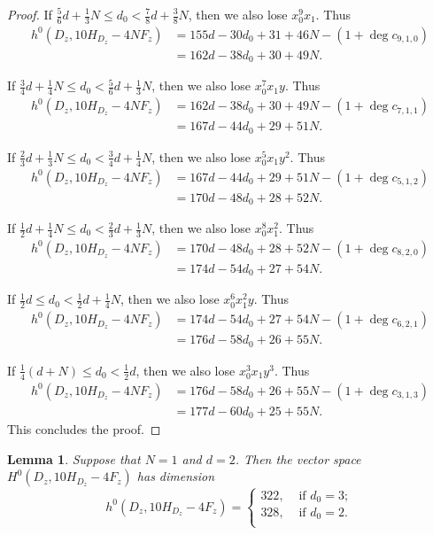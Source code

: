 \documentclass[a4paper,11pt]{amsart}
\newtheorem{lem}[thm]{Lemma}
\theoremstyle{definition}
\theoremstyle{remark}
\numberwithin{equation}{section}
\begin{document}
\begin{proof}
	If $\frac56d + \frac13 N \le d_0 < \frac78d + \frac38 N$, then we also lose $x_0^9x_1$. Thus
	\begin{align*}
		h^0(D_z, 10H_{D_z} - 4NF_z) & = 155d - 30d_0 + 31 + 46N - (1 + \deg c_{9, 1, 0}) \\
		& = 162d - 38d_0 + 30 + 49N.
	\end{align*}
	
	If $\frac34d + \frac14 N \le d_0 < \frac56d + \frac13 N$, then we also lose $x_0^7x_1y$. Thus
	\begin{align*}
		h^0(D_z, 10H_{D_z} - 4NF_z) & = 162d - 38d_0 + 30 + 49N - (1 + \deg c_{7, 1, 1}) \\
		& = 167d - 44d_0 + 29 + 51N.
	\end{align*}
	
	If $\frac23d + \frac13 N \le d_0 < \frac34d + \frac14 N$, then we also lose $x_0^5x_1y^2$. Thus
	\begin{align*}
		h^0(D_z, 10H_{D_z} - 4NF_z) & = 167d - 44d_0 + 29 + 51N - (1 + \deg c_{5, 1, 2}) \\
		& = 170d - 48d_0 + 28 + 52N.
	\end{align*}
	
	If $\frac12d + \frac14 N \le d_0 < \frac23d + \frac13 N$, then we also lose $x_0^8x_1^2$. Thus
	\begin{align*}
		h^0(D_z, 10H_{D_z} - 4NF_z) & = 170d - 48d_0 + 28 + 52N - (1 + \deg c_{8, 2, 0}) \\
		& = 174d - 54d_0 + 27 + 54N.
	\end{align*}
	
	If $\frac12d \le d_0 < \frac12d + \frac14 N$, then we also lose $x_0^6x_1^2y$. Thus
	\begin{align*}
		h^0(D_z, 10H_{D_z} - 4NF_z) & = 174d - 54d_0 + 27 + 54N - (1 + \deg c_{6, 2, 1}) \\
		& = 176d - 58d_0 + 26 + 55N.
	\end{align*}
	
	If $\frac14(d + N) \le d_0 < \frac12d$, then we also lose $x_0^3x_1y^3$. Thus
	\begin{align*}
		h^0(D_z, 10H_{D_z} - 4NF_z) & = 176d - 58d_0 + 26 + 55N - (1 + \deg c_{3, 1, 3}) \\
		& = 177d - 60d_0 + 25 + 55N.
	\end{align*}
	This concludes the proof.
\end{proof}

\begin{lem}\label{lem: dimension 10H N=1 1}
  Suppose that $N=1$ and $d=2$. Then the vector space $H^0(D_z, 10H_{D_z} - 4F_z)$ has dimension
	$$
	h^0(D_z, 10H_{D_z} - 4F_z)=
	\begin{cases}
		322, & \text{ if } d_0 = 3;\\ 
		328, & \text{ if } d_0 = 2.\\
 	\end{cases}
	$$
\end{lem}
\end{document}

